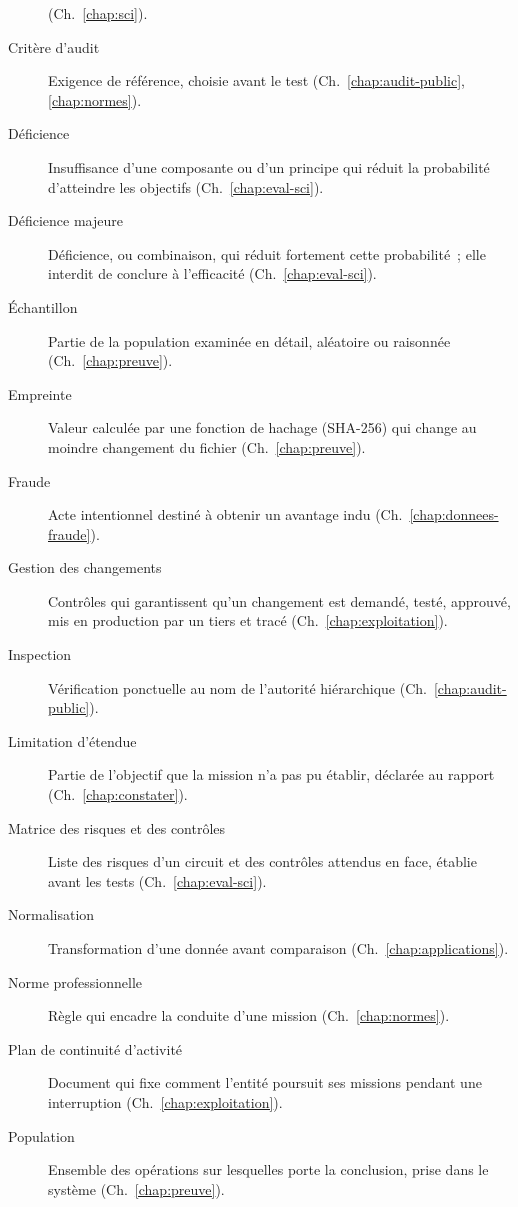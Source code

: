 \begin{description}
          (Ch.~\ref{chap:sci}).
    \item[Critère d'audit] Exigence de référence, choisie avant le test
          (Ch.~\ref{chap:audit-public}, \ref{chap:normes}).
    \item[Déficience] Insuffisance d'une composante ou d'un principe qui
          réduit la probabilité d'atteindre les objectifs
          (Ch.~\ref{chap:eval-sci}).
    \item[Déficience majeure] Déficience, ou combinaison, qui réduit
          fortement cette probabilité~; elle interdit de conclure à
          l'efficacité (Ch.~\ref{chap:eval-sci}).
    \item[Échantillon] Partie de la population examinée en détail,
          aléatoire ou raisonnée (Ch.~\ref{chap:preuve}).
    \item[Empreinte] Valeur calculée par une fonction de hachage (SHA-256)
          qui change au moindre changement du fichier (Ch.~\ref{chap:preuve}).
    \item[Fraude] Acte intentionnel destiné à obtenir un avantage indu
          (Ch.~\ref{chap:donnees-fraude}).
    \item[Gestion des changements] Contrôles qui garantissent qu'un
          changement est demandé, testé, approuvé, mis en production par un
          tiers et tracé (Ch.~\ref{chap:exploitation}).
    \item[Inspection] Vérification ponctuelle au nom de l'autorité
          hiérarchique (Ch.~\ref{chap:audit-public}).
    \item[Limitation d'étendue] Partie de l'objectif que la mission n'a pas
          pu établir, déclarée au rapport (Ch.~\ref{chap:constater}).
    \item[Matrice des risques et des contrôles] Liste des risques d'un
          circuit et des contrôles attendus en face, établie avant les tests
          (Ch.~\ref{chap:eval-sci}).
    \item[Normalisation] Transformation d'une donnée avant comparaison
          (Ch.~\ref{chap:applications}).
    \item[Norme professionnelle] Règle qui encadre la conduite d'une mission
          (Ch.~\ref{chap:normes}).
    \item[Plan de continuité d'activité] Document qui fixe comment l'entité
          poursuit ses missions pendant une interruption
          (Ch.~\ref{chap:exploitation}).
    \item[Population] Ensemble des opérations sur lesquelles porte la
          conclusion, prise dans le système (Ch.~\ref{chap:preuve}).

\end{description}
